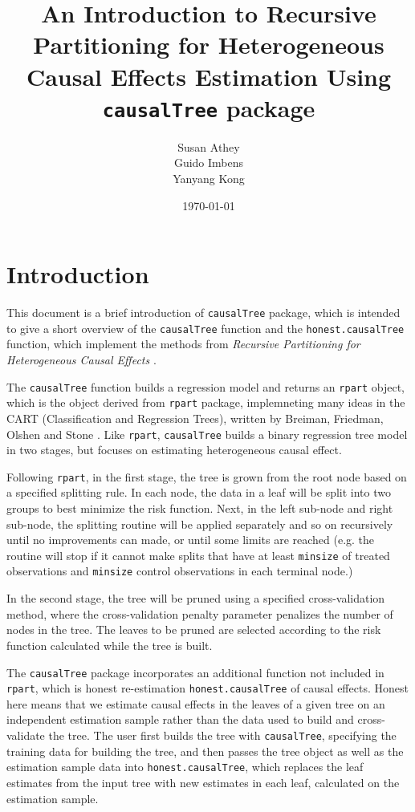 \documentclass[11pt]{article}
\title {An Introduction to Recursive Partitioning for Heterogeneous Causal Effects Estimation Using \texttt{causalTree} package}
\author{Susan Athey \\
        Guido Imbens\\
        Yanyang Kong}
\date{\today}
\begin{document}

\maketitle
\tableofcontents

\section{Introduction}
This document is a brief introduction of \texttt{causalTree} package, which is intended to give a short overview of the \texttt{causalTree} function and the \texttt{honest.causalTree} function, which implement the methods from \textit{Recursive Partitioning for Heterogeneous Causal Effects} \cite{athey2015machine}. \par 
The \texttt{causalTree} function builds a regression model and returns an \texttt{rpart} object, which is the object derived from \texttt{rpart} package, implemneting many ideas in the CART (Classification and Regression Trees), written by Breiman, Friedman, Olshen and Stone \cite{Breiman83}. Like \texttt{rpart}, \texttt{causalTree} builds a binary regression tree model in two stages, but focuses on estimating heterogeneous causal effect.\par
Following \texttt{rpart}, in the first stage, the tree is grown from the root node based on a specified splitting rule. In each node, the data in a leaf will be split into two groups to best minimize the risk function. Next, in the left sub-node and right sub-node, the splitting routine will be applied separately and so on recursively until no improvements can made, or until some limits are reached (e.g. the routine will stop if it cannot make splits that have at least \texttt{minsize} of treated observations and \texttt{minsize} control observations in each terminal node.) \par
In the second stage, the tree will be pruned using a specified cross-validation method, where the cross-validation penalty parameter
penalizes the number of nodes in the tree. The leaves to be pruned are selected according to the risk function calculated while
the tree is built. \par
The \texttt{causalTree} package incorporates an additional function not included in \texttt{rpart}, which is honest re-estimation \texttt{honest.causalTree} of causal effects. Honest here means that we estimate causal effects in the leaves of a given tree on an independent estimation sample rather than the data used to build and cross-validate the tree.  The user first builds the tree
with \texttt{causalTree}, specifying the training data for building the tree, and then passes the tree object as well as the estimation sample data
into \texttt{honest.causalTree}, which replaces the leaf estimates from the input tree with new estimates in each leaf, calculated on the estimation sample.
\end{document}
